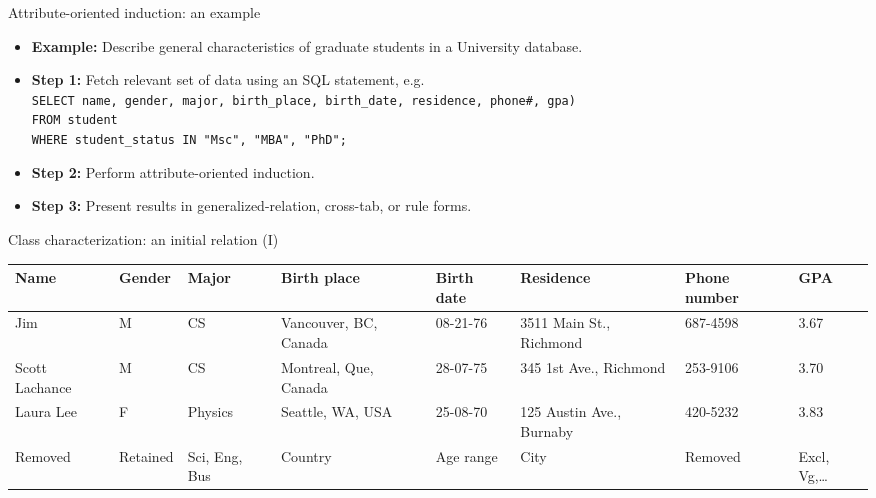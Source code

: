 \documentclass[aspectratio=169,t]{beamer}
\begin{document}
  { 
    \begin{frame}{Attribute-oriented induction: an example}
    \begin{itemize}
      \item \textbf{Example:} Describe general characteristics of graduate students in a University database.
      \item \textbf{Step 1:} Fetch relevant set of data using an SQL statement, e.g.\\[0.1cm]
      \texttt{SELECT name, gender, major, birth\_place, birth\_date, residence, phone\#, gpa)}\\
      \texttt{FROM student}\\
      \texttt{WHERE student\_status IN {"Msc", "MBA", "PhD"};}\\[0.1cm]
      \item \textbf{Step 2:} Perform attribute-oriented induction.
      \item \textbf{Step 3:} Present results in generalized-relation, cross-tab, or rule forms.
    \end{itemize}
    \end{frame}
  }

  { 
    \begin{frame}{Class characterization: an initial relation (I)}
    \begin{table}
    \small
    \begin{tabularx}{\textwidth}{|X|X|X|X|X|X|X|X|}
    \hline
    \textbf{Name} & \textbf{Gender} & \textbf{Major} & \textbf{Birth place} & \textbf{Birth date} & \textbf{Residence} & \textbf{Phone number} & \textbf{GPA} \\\hline
    Jim & M & CS & Vancouver, BC, Canada & 08-21-76 & 3511 Main St., Richmond & 687-4598 & 3.67 \\\hline
    Scott Lachance & M & CS & Montreal, Que, Canada & 28-07-75 & 345 1st Ave., Richmond & 253-9106 & 3.70 \\\hline
    Laura Lee & F & Physics & Seattle, WA, USA & 25-08-70 & 125 Austin Ave., Burnaby & 420-5232 & 3.83 \\\hline
    {\color{red}Removed} & {\color{red}Retained} & {\color{red}Sci, Eng, Bus} & {\color{red}Country} & {\color{red}Age range} & {\color{red}City} & {\color{red}Removed} & {\color{red}Excl, Vg,\ldots} \\\hline
    \end{tabularx}
    \end{table}
    \end{frame}
  }
\end{document}

